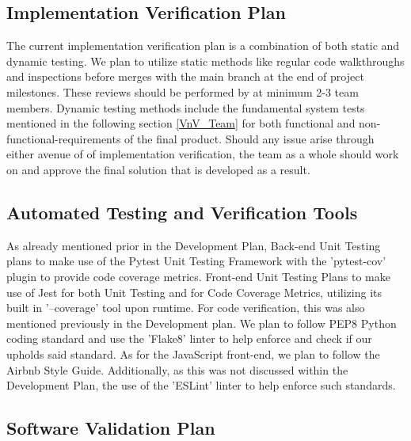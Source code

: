 \documentclass[12pt, titlepage]{article}
\begin{document}
\subsection{Implementation Verification Plan}

The current implementation verification plan is a combination of both static and dynamic testing.  We plan to utilize static methods like regular code walkthroughs and inspections before merges with the main branch at the end of project milestones.  These reviews should be performed by at minimum 2-3 team members. Dynamic testing methods include the fundamental system tests mentioned in the following section \ref{VnV_Team} for both functional and non-functional-requirements of the final product. Should any issue arise through either avenue of of implementation verification, the team as a whole should work on and approve the final solution that is developed as a result.

\subsection{Automated Testing and Verification Tools}

As already mentioned prior in the Development Plan, Back-end Unit Testing plans to make use of the Pytest Unit Testing Framework with the 'pytest-cov' plugin to provide code coverage metrics. Front-end Unit Testing Plans to make use of Jest for both Unit Testing and for Code Coverage Metrics, utilizing its built in '--coverage' tool upon runtime.\newline
\indent For code verification, this was also mentioned previously in the Development plan. We plan to follow PEP8 Python coding standard and use the 'Flake8' linter to help enforce and check if our upholds said standard. As for the JavaScript front-end, we plan to follow the Airbnb Style Guide. Additionally, as this was not discussed within the Development Plan, the use of the 'ESLint' linter to help enforce such standards.

\subsection{Software Validation Plan}
\end{document}
